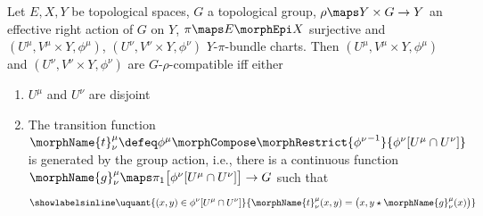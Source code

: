 \documentclass{article}
\begin{document}
\begin{definition}
\label{def:Grho-compat}
Let $E,X,Y$ be topological spaces, $G$ a topological group,
$\rho \maps Y \times G \to Y$ an effective right action of
$G$ on $Y$, $\pi \maps E \morphEpi X$ surjective
and $(U^\mu, V^\mu \times Y, \phi^\mu)$,
$(U^\nu, V^\nu \times Y, \phi^\nu)$ $Y$-$\pi$-bundle charts. Then
$(U^\mu, V^\mu \times Y, \phi^\mu)$ and
$(U^\nu, V^\nu \times Y, \phi^\nu)$ are $G$-$\rho$-compatible iff either
\begin{enumerate}
\item $U^\mu$ and $U^\nu$ are disjoint
\item
The transition function
$
  \morphName{t}^\mu_\nu \defeq
    \phi^\mu \morphCompose
    \morphRestrict{{\phi^\nu}^{-1}}{\phi^\nu[U^\mu \cap U^\nu]}
$
is generated by the group action, i.e., there is a continuous function
$
  \morphName{g}^\mu_\nu
  \maps \pi_1 \bigl [ \phi^\nu[U^\mu \cap U^\nu] \bigr ] \to G
$
such that
\begin{equation}
\showlabelsinline
\label{eq:transitiongroup}
\uquant
  {{(x,y) \in \phi^\nu[U^\mu \cap U^\nu]}}
  {
    \morphName{t}^\mu_\nu(x,y) =
    \bigl ( x, y \star \morphName{g}^\mu_\nu(x) \bigr )
  }
\end{equation}
\end{enumerate}
\end{definition}
\end{document}
